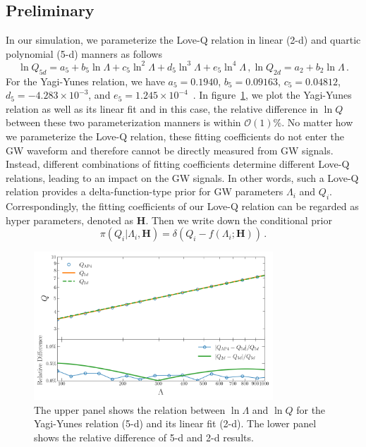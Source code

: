 \documentclass[a4paper,11pt]{article}
\begin{document}
\subsection{Preliminary} 
\label{sec2_1}
In our simulation, we parameterize the Love-Q relation in linear (2-d) and quartic polynomial (5-d) 
manners as follows
\begin{subequations}
\label{Love-Q Relation}
\begin{equation}
\label{5-d_Love_Q_eq}
    \ln Q_{5d}=a_5 + b_5 \ln \Lambda + c_5 \ln^2\Lambda + d_5 \ln^3\Lambda + e_5 \ln^4 \Lambda\,,
\end{equation}
\begin{equation}
\label{2-d_Love_Q_eq}
    \ln Q_{2d} = a_2 + b_2 \ln \Lambda\,.
\end{equation}
\end{subequations}
For the Yagi-Yunes relation, we have $a_5=0.1940$, $b_5=0.09163$, $c_5=0.04812$, 
$d_5=-4.283\times10^{-3}$, and $e_5=1.245\times10^{-4}$~\cite{Yagi_2017}. In figure~\ref{relative_difference}, 
we plot the Yagi-Yunes relation as well as its linear fit and in this case, the relative difference in $\ln Q$ 
between these two parameterization manners is within $\mathcal{O}(1) \%$. No matter how we parameterize the 
Love-Q relation, these fitting coefficients do not enter the GW waveform and therefore cannot be directly 
measured from GW signals. Instead, different combinations of fitting coefficients determine different Love-Q relations, 
leading to an impact on the GW signals. In other words, such a Love-Q relation provides a delta-function-type 
prior for GW parameters $\Lambda_i$ and $Q_i$. Correspondingly, the fitting coefficients of our Love-Q relation 
can be regarded as hyper parameters, denoted as $\bm{H}$. Then we write down the conditional prior
\begin{equation}
\label{delta function prior}
\pi(Q_i|\Lambda_i,\bm{H}) = \delta(Q_i-f(\Lambda_i;\bm{H}))\,.
\end{equation}

\begin{figure}[tbp]
\centering
\includegraphics[width=0.8\textwidth]{2d-5d difference.png}%
\caption{\label{relative_difference} The upper panel shows the relation between $\ln \Lambda$ and $\ln Q$ 
for the Yagi-Yunes relation (5-d) and its linear fit (2-d). The lower panel shows the relative difference 
of 5-d and 2-d results.}
\end{figure}
\end{document}
